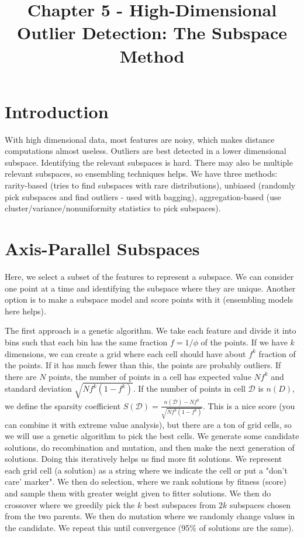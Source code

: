 \documentclass[a4paper]{article}
\title{Chapter 5 - High-Dimensional Outlier Detection: The Subspace Method}
\date{}
\begin{document}
\maketitle

\section{Introduction}
With high dimensional data, most features are noisy, which makes distance
computations almost useless. Outliers are best detected in a lower dimensional
subspace. Identifying the relevant subspaces is hard. There may also be
multiple relevant subspaces, so ensembling techniques helps. We have three
methods: rarity-based (tries to find subspaces with rare distributions),
unbiased (randomly pick subspaces and find outliers - used with bagging),
aggregation-based (use cluster/variance/nonuniformity statistics to pick
subspaces).

\section{Axis-Parallel Subspaces}
Here, we select a subset of the features to represent a subspace. We can
consider one point at a time and identifying the subspace where they are
unique. Another option is to make a subspace model and score points with it
(ensembling models here helps).

The first approach is a genetic algorithm. We take each feature and divide it
into bins such that each bin has the same fraction $f = 1/\phi$ of the points.
If we have $k$ dimensions, we can create a grid where each cell should have
about $f^k$ fraction of the points. If it has much fewer than this, the points
are probably outliers. If there are $N$ points, the number of points in a cell
has expected value $Nf^k$ and standard deviation $\sqrt{Nf^k (1 - f^k)}$. If
the number of points in cell $\mathcal{D}$ is $n(D)$, we define the sparsity
coefficient $S(\mathcal{D}) = \frac{n(\mathcal{D}) - Nf^k}{\sqrt{Nf^k (1 - f^k)}}$.
This is a nice score (you can combine it with extreme value analysis), but
there are a ton of grid cells, so we will use a genetic algorithm to pick
the best cells. We generate some candidate solutions, do recombination and
mutation, and then make the next generation of solutions. Doing this iteratively
helps us find more fit solutions. We represent each grid cell (a solution) as a
string where we indicate the cell or put a "don't care' marker". We then do
selection, where we rank solutions by fitness (score) and sample them with
greater weight given to fitter solutions. We then do crossover where we greedily
pick the $k$ best subspaces from $2k$ subspaces chosen from the two parents. We
then do mutation where we randomly change values in the candidate. We repeat
this until convergence (95\% of solutions are the same).
\end{document}
